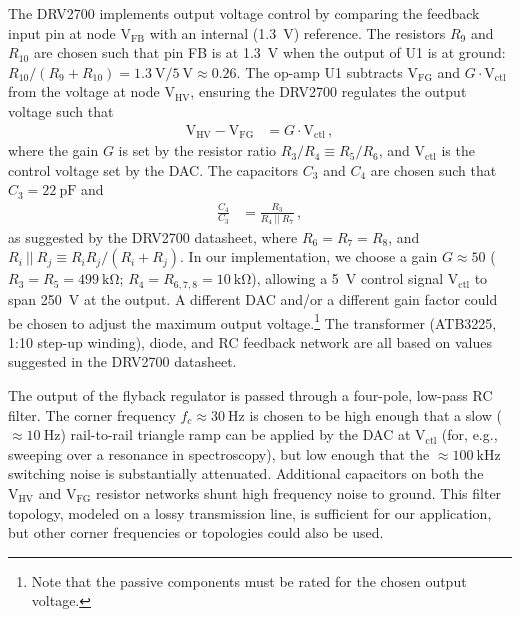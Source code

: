 \documentclass[aip,rsi,reprint]{revtex4-1} %
\begin{document}
The DRV2700 implements output voltage control by comparing the feedback input pin at node $\text{V}_\text{FB}$ with an internal (\SI{1.3}{\volt}) reference.
The resistors $R_9$ and $R_{10}$ are chosen such that pin FB is at \SI{1.3}{\volt} when the output of U1 is at ground: $R_{10}/(R_9+R_{10}) = \SI{1.3}{\volt}/\SI{5}{\volt} \approx \num{0.26}$.
The op-amp U1 subtracts $\text{V}_\text{FG}$ and $G\cdot \text{V}_\text{ctl}$ from the voltage at node $\text{V}_\text{HV}$, ensuring the DRV2700 regulates the output voltage such that
\begin{align}
\label{Eq:U1Output}
\text{V}_\text{HV} - \text{V}_{\text{FG}} &= G\cdot \text{V}_{\text{ctl}}\,,
\end{align}
where the gain $G$ is set by the resistor ratio $R_3/R_4 \equiv R_5/R_6$, and $\text{V}_\text{ctl}$ is the control voltage set by the DAC.
The capacitors $C_3$ and $C_4$ are chosen such that $C_3 = \SI{22}{\pico\farad}$ and
\begin{align}
\frac{C_4}{C_3} &= \frac{R_3}{R_4~||~R_7}\,,
\end{align}
as suggested by the DRV2700 datasheet\cite{DRV2700Datasheet}, where $R_6 = R_7 = R_8$, and $R_i~||~R_j \equiv R_i R_j/(R_i + R_j)$.
In our implementation, we choose a gain $G\approx 50$ ($R_3 = R_5 = \SI{499}{\kilo\ohm}$; $R_4 = R_{6,7,8} = \SI{10}{\kilo\ohm}$), allowing a \SI{5}{\volt} control signal $\text{V}_\text{ctl}$ to span \SI{250}{\volt} at the output. 
A different DAC and/or a different gain factor could be chosen to adjust the maximum output voltage.\footnote{Note that the passive components must be rated for the chosen output voltage.}
The transformer (ATB3225, 1:10 step-up winding), diode, and RC feedback network are all based on values suggested in the DRV2700 datasheet.\cite{DRV2700Datasheet,DRV2700EVMUserGuide}

The output of the flyback regulator is passed through a four-pole, low-pass RC filter.
The corner frequency $f_c \approx \SI{30}{\hertz}$ is chosen to be high enough that a slow ($\approx \SI{10}{\hertz}$) rail-to-rail triangle ramp can be applied by the DAC at $\text{V}_\text{ctl}$ (for, e.g., sweeping over a resonance in spectroscopy), but low enough that the $\approx \SI{100}{\kilo\hertz}$ switching noise is substantially attenuated.
Additional capacitors on both the $\text{V}_\text{HV}$ and $\text{V}_\text{FG}$ resistor networks shunt high frequency noise to ground.
This filter topology, modeled on a lossy transmission line, is sufficient for our application, but other corner frequencies or topologies could also be used.
\end{document}
